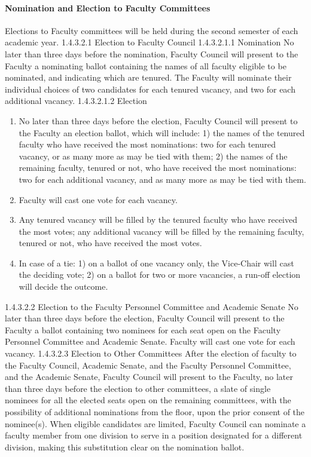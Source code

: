\documentclass[letterpaper, 11pt]{article}
\begin{document}
			\paragraph{	Nomination and Election to Faculty Committees}
				Elections to Faculty committees will be held during the second semester of each academic year.
				1.4.3.2.1 Election to Faculty Council
				1.4.3.2.1.1 Nomination
				No later than three days before the nomination, Faculty Council will present to the Faculty a nominating ballot containing the names of all faculty eligible to be nominated, and indicating which are tenured.  The Faculty will nominate their individual choices of two candidates for each tenured vacancy, and two for each additional vacancy.
				1.4.3.2.1.2 Election
				\begin{enumerate}[label=\alph*)]
					\item{No later than three days before the election, Faculty Council will present to the Faculty an election ballot, which will include:}
					1) the names of the tenured faculty who have received the most nominations:  two for each tenured vacancy, or as many more as may be tied with them;
					2) the names of the remaining faculty, tenured or not, who have received the most nominations:  two for each additional vacancy, and as many more as may be tied with them.
					\item{Faculty will cast one vote for each vacancy.}
					\item{Any tenured vacancy will be filled by the tenured faculty who have received the most votes; any additional vacancy will be filled by the remaining faculty, tenured or not, who have received the most votes.}
					\item{In case of a tie:}
					1) on a ballot of one vacancy only, the Vice-Chair will cast the deciding vote;
					2) on a ballot for two or more vacancies, a run-off election will decide the outcome.
				\end{enumerate}
				1.4.3.2.2 Election to the Faculty Personnel Committee and Academic Senate
				No later than three days before the election, Faculty Council will present to the Faculty a ballot containing two nominees for each seat open on the Faculty Personnel Committee and Academic Senate.  Faculty will cast one vote for each vacancy.
				1.4.3.2.3 Election to Other Committees
				After the election of faculty to the Faculty Council, Academic Senate, and the Faculty Personnel Committee, and the Academic Senate, Faculty Council will present to the Faculty, no later than three days before the election to other committees, a slate of single nominees for all the elected seats open on the remaining committees, with the possibility of additional nominations from the floor, upon the prior consent of the nominee(s).  When eligible candidates are limited, Faculty Council can nominate a faculty member from one division to serve in a position designated for a different division, making this substitution clear on the nomination ballot.
\end{document}

